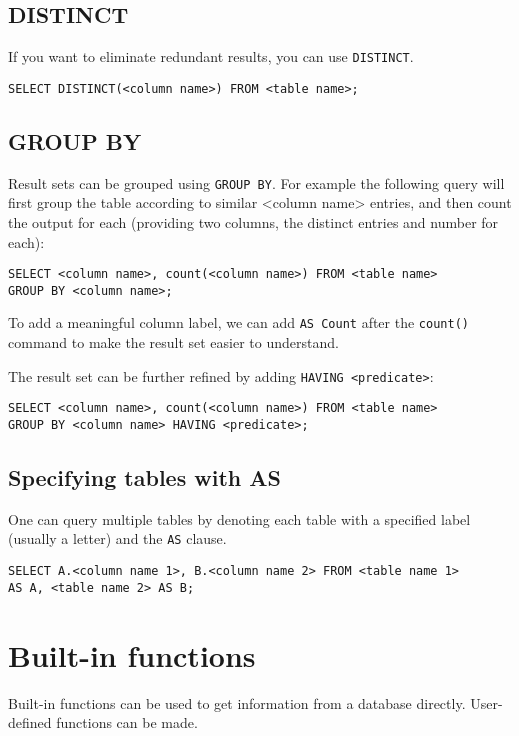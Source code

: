 \documentclass[]{article}
\begin{document}
\subsection{DISTINCT}
If you want to eliminate redundant results, you can use \verb|DISTINCT|.

\begin{verbatim}
SELECT DISTINCT(<column name>) FROM <table name>;
\end{verbatim}

\subsection{GROUP BY}

Result sets can be grouped using \verb|GROUP BY|.  For example the following query will first group the table according to similar <column name> entries, and then count the output for each (providing two columns, the distinct entries and number for each):

\begin{verbatim}
SELECT <column name>, count(<column name>) FROM <table name> 
GROUP BY <column name>;
\end{verbatim}

To add a meaningful column label, we can add \verb|AS Count| after the \verb|count()| command to make the result set easier to understand.

The result set can be further refined by adding \verb|HAVING <predicate>|:

\begin{verbatim}
SELECT <column name>, count(<column name>) FROM <table name> 
GROUP BY <column name> HAVING <predicate>;
\end{verbatim}

\subsection{Specifying tables with AS}

One can query multiple tables by denoting each table with a specified label (usually a letter) and the \verb|AS| clause. 

\begin{verbatim}
SELECT A.<column name 1>, B.<column name 2> FROM <table name 1> 
AS A, <table name 2> AS B;
\end{verbatim}

\section{Built-in functions}
Built-in functions can be used to get information from a database directly.  User-defined functions can be made.
\end{document}
